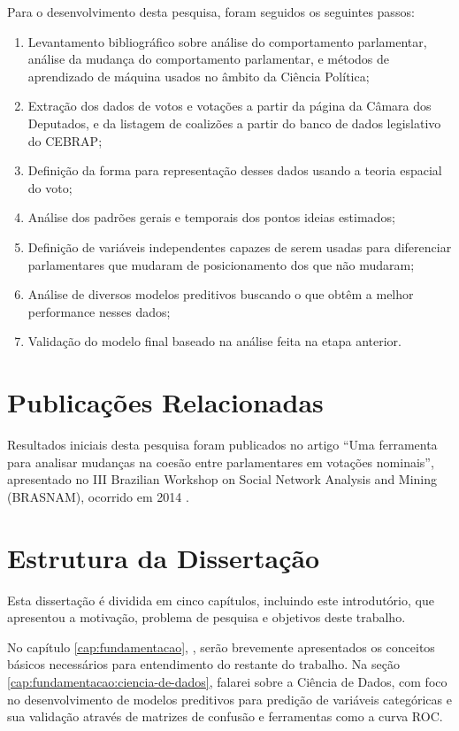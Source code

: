 Para o desenvolvimento desta pesquisa, foram seguidos os seguintes passos:

\begin{enumerate}
  \item Levantamento bibliográfico sobre análise do comportamento parlamentar,
    análise da mudança do comportamento parlamentar, e métodos de aprendizado
    de máquina usados no âmbito da Ciência Política;
  \item Extração dos dados de votos e votações a partir da página da Câmara dos
    Deputados, e da listagem de coalizões a partir do banco de dados
    legislativo do \gls{CEBRAP};
  \item Definição da forma para representação desses dados usando a teoria
    espacial do voto;
  \item Análise dos padrões gerais e temporais dos pontos ideias estimados;
  \item Definição de variáveis independentes capazes de serem usadas para
    diferenciar parlamentares que mudaram de posicionamento dos que não
    mudaram;
  \item Análise de diversos modelos preditivos buscando o que obtêm a melhor
    performance nesses dados;
  \item Validação do modelo final baseado na análise feita na etapa anterior.
\end{enumerate}

\section{Publicações Relacionadas}

Resultados iniciais desta pesquisa foram publicados no artigo ``Uma ferramenta
para analisar mudanças na coesão entre parlamentares em votações nominais'',
apresentado no III Brazilian Workshop on Social Network Analysis and Mining
(BRASNAM), ocorrido em 2014 \cite{Baptista2014}.

\section{Estrutura da Dissertação}

Esta dissertação é dividida em cinco capítulos, incluindo este introdutório,
que apresentou a motivação, problema de pesquisa e objetivos deste trabalho.

No capítulo \ref{cap:fundamentacao}, , serão
brevemente apresentados os conceitos básicos necessários para entendimento do
restante do trabalho. Na seção \ref{cap:fundamentacao:ciencia-de-dados}, falarei
sobre a Ciência de Dados, com foco no desenvolvimento de modelos preditivos
para predição de variáveis categóricas e sua validação através de matrizes de
confusão e ferramentas como a curva \gls{ROC}.

